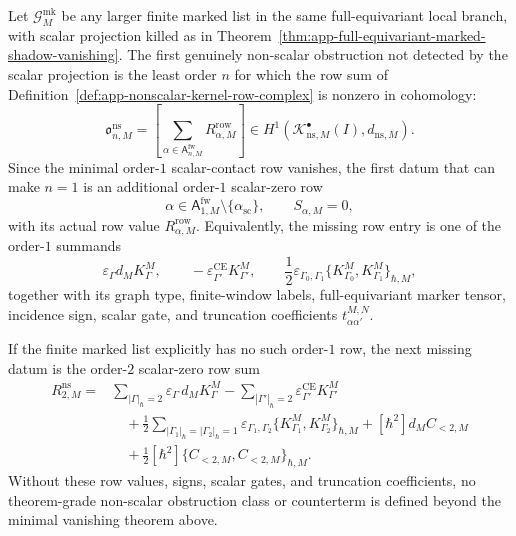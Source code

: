 \begin{prop}
\label{prop:app-first-missing-nonscalar-row}
  Let \(\mathcal G^{\mathrm{mk}}_M\) be any larger finite marked list in
  the same full-equivariant local branch, with scalar projection killed as
  in Theorem~\ref{thm:app-full-equivariant-marked-shadow-vanishing}.  The
  first genuinely non-scalar obstruction not detected by the scalar
  projection is the least order \(n\) for which the row sum of
  Definition~\ref{def:app-nonscalar-kernel-row-complex} is nonzero in
  cohomology:
  \[
    \mathfrak o^{\mathrm{ns}}_{n,M}
      =
    \left[
      \sum_{\alpha\in\mathsf A^{\mathrm{fw}}_{n,M}}
      R^{\mathrm{row}}_{\alpha,M}
    \right]
    \in H^1\!\left(
      \mathcal K^\bullet_{\mathrm{ns},M}(I),d_{\mathrm{ns},M}
    \right).
  \]
  Since the minimal order-\(1\) scalar-contact row vanishes, the first
  datum that can make \(n=1\) is an additional order-\(1\) scalar-zero
  row
  \[
    \alpha\in
    \mathsf A^{\mathrm{fw}}_{1,M}\setminus\{\alpha_{\mathrm{sc}}\},
    \qquad
    S_{\alpha,M}=0,
  \]
  with its actual row value \(R^{\mathrm{row}}_{\alpha,M}\).  Equivalently,
  the missing row entry is one of the order-\(1\) summands
  \[
    \varepsilon_\Gamma d_M K^M_\Gamma,\qquad
    -\varepsilon^{\mathrm{CE}}_{\Gamma'}K^M_{\Gamma'},\qquad
    \frac12\varepsilon_{\Gamma_0,\Gamma_1}
      \{K^M_{\Gamma_0},K^M_{\Gamma_1}\}_{\hbar,M},
  \]
  together with its graph type, finite-window labels, full-equivariant
  marker tensor, incidence sign, scalar gate, and truncation coefficients
  \(t^{M,N}_{\alpha\alpha'}\).

  If the finite marked list explicitly has no such order-\(1\) row, the
  next missing datum is the order-\(2\) scalar-zero row sum
  \[
  \begin{aligned}
    R^{\mathrm{ns}}_{2,M}
      ={}&
      \sum_{|\Gamma|_\hbar=2}
        \varepsilon_\Gamma\,d_M K^M_\Gamma
      -\sum_{|\Gamma'|_\hbar=2}
        \varepsilon^{\mathrm{CE}}_{\Gamma'}K^M_{\Gamma'}\\
      &\quad
      +\frac12
      \sum_{|\Gamma_1|_\hbar=|\Gamma_2|_\hbar=1}
        \varepsilon_{\Gamma_1,\Gamma_2}
        \{K^M_{\Gamma_1},K^M_{\Gamma_2}\}_{\hbar,M}
      +[\hbar^2]d_M C_{<2,M}\\
      &\quad
      +\frac12[\hbar^2]
        \{C_{<2,M},C_{<2,M}\}_{\hbar,M}.
  \end{aligned}
  \]
  Without these row values, signs, scalar gates, and truncation
  coefficients, no theorem-grade non-scalar obstruction class or
  counterterm is defined beyond the minimal vanishing theorem above.
\end{prop}

